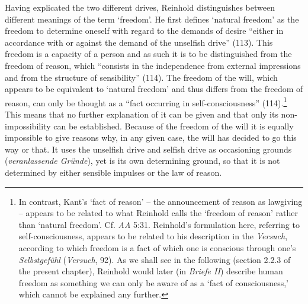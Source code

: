  Having explicated the two different drives, Reinhold distinguishes between different meanings of the term `freedom'. He first defines `natural freedom' as the freedom to determine oneself with regard to the demands of desire ``either in accordance with or against the demand of the unselfish drive'' (113). This freedom is a capacity of a person and as such it is to be distinguished from the freedom of reason, which ``consists in the independence from external impressions and from the structure of sensibility'' (114). The freedom of the will, which appears to be equivalent to `natural freedom' and thus differs from the freedom of reason, can only be thought as a ``fact occurring in self{-}consciousness'' (114).\footnote{\label{footnote:_Ref232953324} In contrast, Kant's `fact of reason' {--} the announcement of reason as lawgiving {--} appears to be related to what Reinhold calls the `freedom of reason' rather than `natural freedom'. Cf. \textit{AA} 5:31. Reinhold's formulation here, referring to self{-}consciousness, appears to be related to his description in the \textit{Versuch}, according to which freedom is a fact of which one is conscious through one's \textit{Selbstgef\"{u}hl }(\textit{Versuch}, 92). As we shall see in the following (section 2.2.3 of the present chapter), Reinhold would later (in \textit{Briefe II}) describe human freedom as something we can only be aware of as a `fact of consciousness,' which cannot be explained any further. } This means that no further explanation of it can be given and that only its non{-}impossibility can be established. Because of the freedom of the will it is equally impossible to give reasons why, in any given case, the will has decided to go this way or that. It uses the unselfish drive and selfish drive as occasioning grounds (\textit{veranlassende Gr\"{u}nde}), yet is its own determining ground, so that it is not determined by either sensible impulses or the law of reason. 

